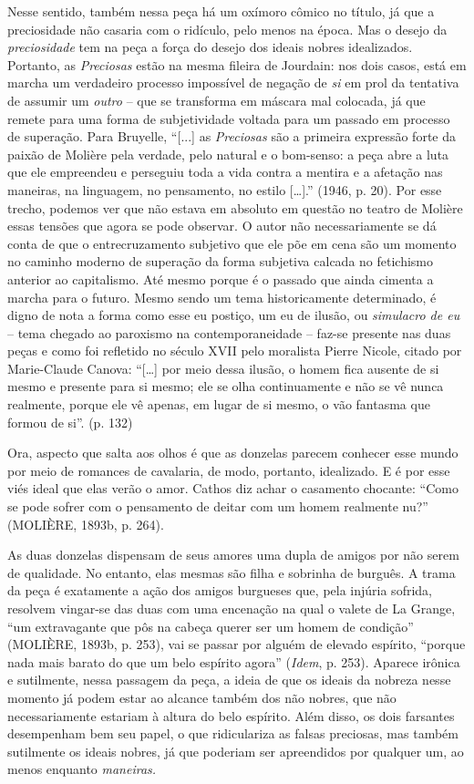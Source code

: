 Nesse sentido, também nessa peça há um oxímoro cômico no título, já que
a preciosidade não casaria com o ridículo, pelo menos na época. Mas o
desejo da \emph{preciosidade} tem na peça a força do desejo dos ideais
nobres idealizados. Portanto, as \emph{Preciosas} estão na mesma fileira
de Jourdain: nos dois casos, está em marcha um verdadeiro processo
impossível de negação de \emph{si} em prol da tentativa de assumir um
\emph{outro} -- que se transforma em máscara mal colocada, já que remete
para uma forma de subjetividade voltada para um passado em processo de
superação. Para Bruyelle, ``{[}...{]} as \emph{Preciosas} são a primeira
expressão forte da paixão de Molière pela verdade, pelo natural e o
bom-senso: a peça abre a luta que ele empreendeu e perseguiu toda a vida
contra a mentira e a afetação nas maneiras, na linguagem, no pensamento,
no estilo {[}\ldots{}{]}.'' (1946, p. 20). Por esse trecho, podemos ver
que não estava em absoluto em questão no teatro de Molière essas tensões
que agora se pode observar. O autor não necessariamente se dá conta de
que o entrecruzamento subjetivo que ele põe em cena são um momento no
caminho moderno de superação da forma subjetiva calcada no fetichismo
anterior ao capitalismo. Até mesmo porque é o passado que ainda cimenta
a marcha para o futuro. Mesmo sendo um tema historicamente determinado,
é digno de nota a forma como esse eu postiço, um eu de ilusão, ou
\emph{simulacro de eu} -- tema chegado ao paroxismo na contemporaneidade
-- faz-se presente nas duas peças e como foi refletido no século XVII
pelo moralista Pierre Nicole, citado por Marie-Claude Canova:
``{[}\ldots{}{]} por meio dessa ilusão, o homem fica ausente de si mesmo
e presente para si mesmo; ele se olha continuamente e não se vê nunca
realmente, porque ele vê apenas, em lugar de si mesmo, o vão fantasma
que formou de si''. (p. 132)

Ora, aspecto que salta aos olhos é que as donzelas parecem conhecer esse
mundo por meio de romances de cavalaria, de modo, portanto, idealizado.
E é por esse viés ideal que elas verão o amor. Cathos diz achar o
casamento chocante: ``Como se pode sofrer com o pensamento de deitar com
um homem realmente nu?'' (MOLIÈRE, 1893b, p. 264).

As duas donzelas dispensam de seus amores uma dupla de amigos por não
serem de qualidade. No entanto, elas mesmas são filha e sobrinha de
burguês. A trama da peça é exatamente a ação dos amigos burgueses que,
pela injúria sofrida, resolvem vingar-se das duas com uma encenação na
qual o valete de La Grange, ``um extravagante que pôs na cabeça querer
ser um homem de condição'' (MOLIÈRE, 1893b, p. 253), vai se passar por
alguém de elevado espírito, ``porque nada mais barato do que um belo
espírito agora'' (\emph{Idem}, p. 253). Aparece irônica e sutilmente,
nessa passagem da peça, a ideia de que os ideais da nobreza nesse
momento já podem estar ao alcance também dos não nobres, que não
necessariamente estariam à altura do belo espírito. Além disso, os dois
farsantes desempenham bem seu papel, o que ridiculariza as falsas
preciosas, mas também sutilmente os ideais nobres, já que poderiam ser
apreendidos por qualquer um, ao menos enquanto \emph{maneiras.}

